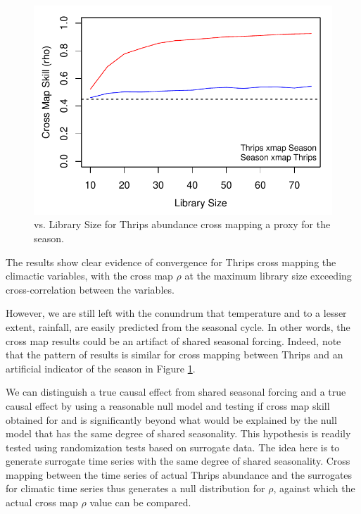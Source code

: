 \documentclass[article]{jss}
\begin{document}
\begin{figure}[t!]
\begin{center}
\includegraphics[width=5in]{article-thrips-season-ccm}
\end{center}
\caption{\label{fig:thrips-season-ccm}  vs. Library Size for Thrips abundance cross mapping a proxy for the season.}
\end{figure}

The results show clear evidence of convergence for Thrips cross mapping the climactic variables, with the cross map $\rho$ at the maximum library size exceeding cross-correlation between the variables.

However, we are still left with the conundrum that temperature and to a lesser extent, rainfall, are easily predicted from the seasonal cycle. In other words, the cross map results could be an artifact of shared seasonal forcing. Indeed, note that the pattern of results is similar for cross mapping between Thrips and an artificial indicator of the season in Figure \ref{fig:thrips-season-ccm}.

We can distinguish a true causal effect from shared seasonal forcing and a true causal effect by using a reasonable null model and testing if cross map skill obtained for  and  is significantly beyond what would be explained by the null model that has the same degree of shared seasonality. This hypothesis is readily tested using randomization tests based on surrogate data. The idea here is to generate surrogate time series with the same degree of shared seasonality. Cross mapping between the time series of actual Thrips abundance and the surrogates for climatic time series thus generates a null distribution for $\rho$, against which the actual cross map $\rho$ value can be compared.
\end{document}
